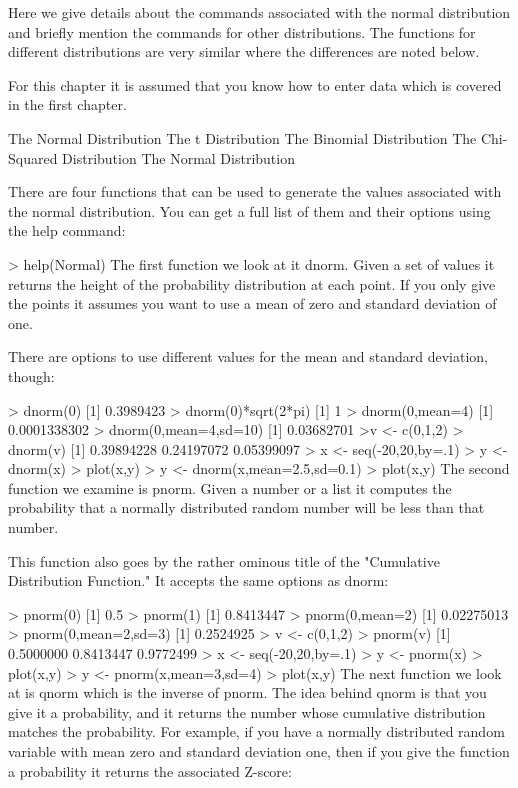 \documentclass[a4paper,12pt]{article}
\begin{document}
Here we give details about the commands associated with the normal distribution and briefly mention the commands for other distributions. The functions for different distributions are very similar where the differences are noted below.

For this chapter it is assumed that you know how to enter data which is covered in the first chapter.

The Normal Distribution
The t Distribution
The Binomial Distribution
The Chi-Squared Distribution
The Normal Distribution

There are four functions that can be used to generate the values associated with the normal distribution. You can get a full list of them and their options using the help command:

> help(Normal)
The first function we look at it dnorm. Given a set of values it returns the height of the probability distribution at each point. If you only give the points it assumes you want to use a mean of zero and standard deviation of one. 

There are options to use different values for the mean and standard deviation, though:

> dnorm(0)
[1] 0.3989423
> dnorm(0)*sqrt(2*pi)
[1] 1
> dnorm(0,mean=4)    
[1] 0.0001338302
> dnorm(0,mean=4,sd=10)
[1] 0.03682701
>v <- c(0,1,2)
> dnorm(v)
[1] 0.39894228 0.24197072 0.05399097
> x <- seq(-20,20,by=.1)
> y <- dnorm(x) 
> plot(x,y)
> y <- dnorm(x,mean=2.5,sd=0.1) 
> plot(x,y)
The second function we examine is pnorm. Given a number or a list it computes the probability that a normally distributed random number will be less than that number. 

This function also goes by the rather ominous title of the "Cumulative Distribution Function." It accepts the same options as dnorm:

> pnorm(0)
[1] 0.5
> pnorm(1)
[1] 0.8413447
> pnorm(0,mean=2)
[1] 0.02275013
> pnorm(0,mean=2,sd=3)
[1] 0.2524925
> v <- c(0,1,2)         
> pnorm(v)
[1] 0.5000000 0.8413447 0.9772499
> x <- seq(-20,20,by=.1)
> y <- pnorm(x) 
> plot(x,y)
> y <- pnorm(x,mean=3,sd=4) 
> plot(x,y)
The next function we look at is qnorm which is the inverse of pnorm. The idea behind qnorm is that you give it a probability, and it returns the number whose cumulative distribution matches the probability. For example, if you have a normally distributed random variable with mean zero and standard deviation one, then if you give the function a probability it returns the associated Z-score:
\end{document}
